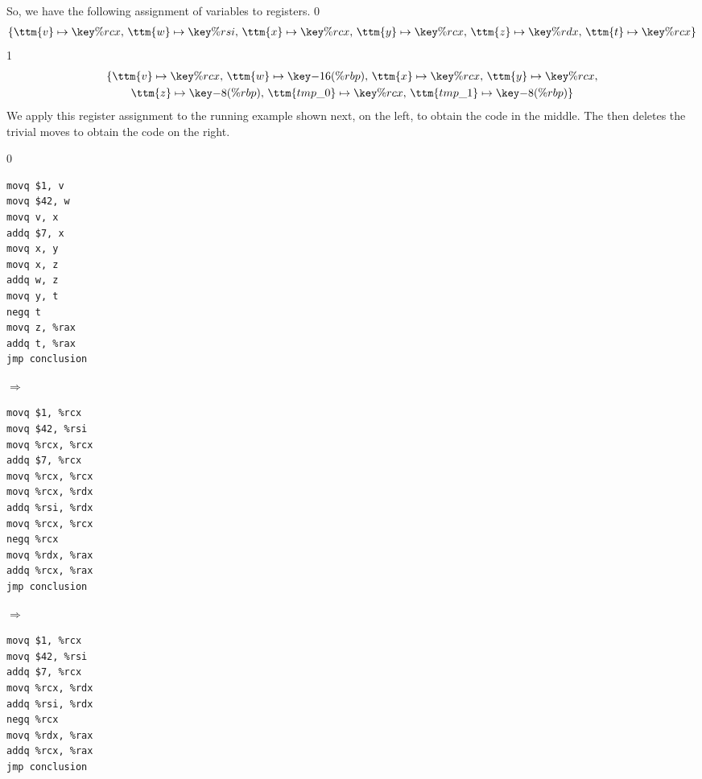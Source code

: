 \documentclass[7x10]{TimesAPriori_MIT}%
\def\racketEd{0}
\def\pythonEd{1}
\def\edition{1}
\newcommand{\pythonColor}[0]{}
\numberwithin{theorem}{chapter}
\numberwithin{definition}{chapter}
\numberwithin{equation}{chapter}
\begin{document}
So, we have the following assignment of variables to registers.
{\if\edition\racketEd
\begin{gather*}
  \{ \ttm{v} \mapsto \key{\%rcx}, \,
     \ttm{w} \mapsto \key{\%rsi}, \,
     \ttm{x} \mapsto \key{\%rcx}, \,
     \ttm{y} \mapsto \key{\%rcx}, \,
     \ttm{z} \mapsto \key{\%rdx}, \,
     \ttm{t} \mapsto \key{\%rcx} \}
\end{gather*}
\fi}
{\if\edition\pythonEd\pythonColor
\begin{gather*}
  \{ \ttm{v} \mapsto \key{\%rcx}, \,
     \ttm{w} \mapsto \key{-16(\%rbp)}, \,
     \ttm{x} \mapsto \key{\%rcx}, \,
     \ttm{y} \mapsto \key{\%rcx}, \\
     \ttm{z} \mapsto \key{-8(\%rbp)}, \,
     \ttm{tmp\_0} \mapsto \key{\%rcx}, \,
     \ttm{tmp\_1} \mapsto \key{-8(\%rbp)} \}
\end{gather*}
\fi}
%
We apply this register assignment to the running example shown next,
on the left, to obtain the code in the middle.  The
 then deletes the trivial moves to obtain
the code on the right.

{\if\edition\racketEd
\begin{center}  
\begin{minipage}{0.2\textwidth}
\begin{lstlisting}
movq $1, v
movq $42, w
movq v, x
addq $7, x
movq x, y
movq x, z
addq w, z
movq y, t
negq t
movq z, %rax
addq t, %rax
jmp conclusion
\end{lstlisting}
\end{minipage}
$\Rightarrow\qquad$
\begin{minipage}{0.25\textwidth}
\begin{lstlisting}
movq $1, %rcx
movq $42, %rsi
movq %rcx, %rcx
addq $7, %rcx
movq %rcx, %rcx
movq %rcx, %rdx
addq %rsi, %rdx
movq %rcx, %rcx
negq %rcx
movq %rdx, %rax
addq %rcx, %rax
jmp conclusion
\end{lstlisting}
\end{minipage}
$\Rightarrow\qquad$
\begin{minipage}{0.23\textwidth}
\begin{lstlisting}
movq $1, %rcx
movq $42, %rsi
addq $7, %rcx
movq %rcx, %rdx
addq %rsi, %rdx
negq %rcx
movq %rdx, %rax
addq %rcx, %rax
jmp conclusion
\end{lstlisting}
\end{minipage}
\end{center}
\fi}
\end{document}
